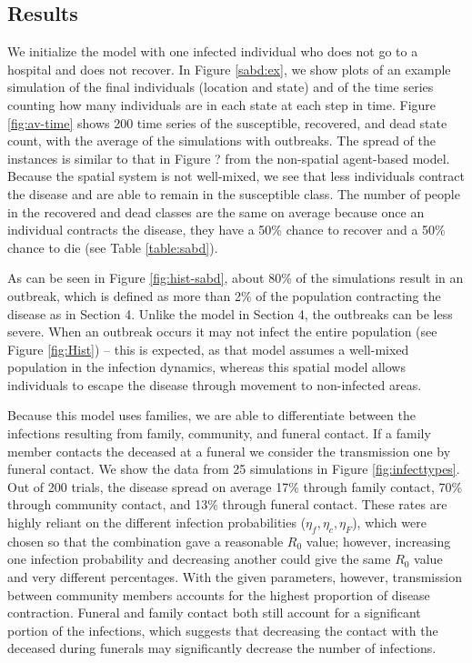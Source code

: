\subsection{Results}
We initialize the model with one infected individual who does not go to a hospital and does not recover. In Figure \ref{sabd:ex}, we show plots of an example simulation of the final individuals (location and state) and of the time series counting how many individuals are in each state at each step in time. Figure \ref{fig:av-time} shows 200 time series of the susceptible, recovered, and dead state count, with the average of the simulations with outbreaks. The spread of the instances is similar to that in Figure ? from the non-spatial agent-based model. Because the spatial system is not well-mixed, we see that less individuals contract the disease and are able to remain in the susceptible class. The number of people in the recovered and dead classes are the same on average because once an individual contracts the disease, they have a 50\% chance to recover and a 50\% chance to die (see Table \ref{table:sabd}).

As can be seen in Figure \ref{fig:hist-sabd}, about 80\% of the simulations result in an outbreak, which is defined as more than 2\% of the population contracting the disease as in Section 4. Unlike the model in Section 4, the outbreaks can be less severe. When an outbreak occurs it may not infect the entire population (see Figure \ref{fig:Hist}) -- this is expected, as that model assumes a well-mixed population in the infection dynamics, whereas this spatial model allows individuals to escape the disease through movement to non-infected areas.

Because this model uses families, we are able to differentiate between the infections resulting from family, community, and funeral contact. If a family member contacts the deceased at a funeral we consider the transmission one by funeral contact. We show the data from 25 simulations in Figure \ref{fig:infecttypes}. Out of 200 trials, the disease spread on average 17\% through family contact, 70\% through community contact, and 13\% through funeral contact. These rates are highly reliant on the different infection probabilities ($\eta_f,\eta_c,\eta_F$), which were chosen so that the combination gave a reasonable $R_0$ value; however, increasing one infection probability and decreasing another could give the same $R_0$ value and very different percentages. With the given parameters, however, transmission between community members accounts for the highest proportion of disease contraction. Funeral and family contact both still account for a significant portion of the infections, which suggests that decreasing the contact with the deceased during funerals may significantly decrease the number of infections.

